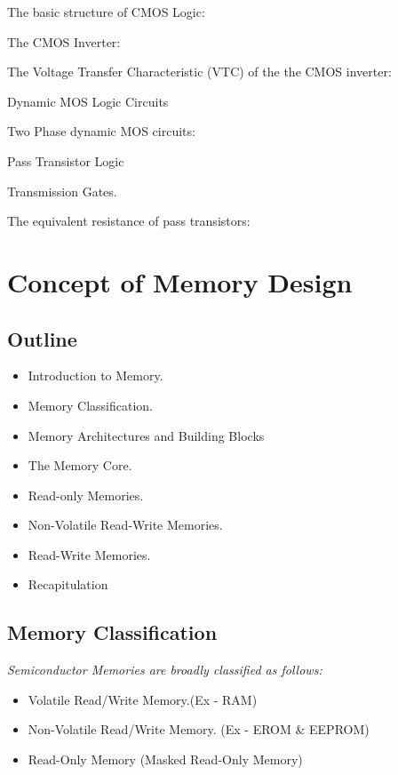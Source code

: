 \documentclass[12pt, letterpaper]{article}
\begin{document}
The basic structure of CMOS Logic:



The CMOS Inverter:

The Voltage Transfer Characteristic (VTC) of the the CMOS inverter:





						  Dynamic MOS Logic Circuits

Two Phase dynamic MOS circuits:


 






							







							Pass Transistor Logic


Transmission Gates.


The equivalent resistance of pass transistors:





\section{Concept of Memory Design}

\subsection{Outline}
\begin{itemize}
    \item Introduction to Memory.
    \item Memory Classification.
    \item Memory Architectures and Building Blocks
    \item The Memory Core.
    \item	Read-only Memories.
    \item	Non-Volatile Read-Write Memories.
    \item Read-Write Memories.
    \item Recapitulation
\end{itemize}

\subsection{Memory Classification}
\emph{Semiconductor Memories are broadly classified as follows:}
\begin{itemize}
    \item  Volatile Read/Write Memory.(Ex - RAM)
    \item Non-Volatile Read/Write Memory. (Ex - EROM \& EEPROM)
    \item Read-Only Memory (Masked Read-Only Memory)
\end{itemize}
\end{document}
